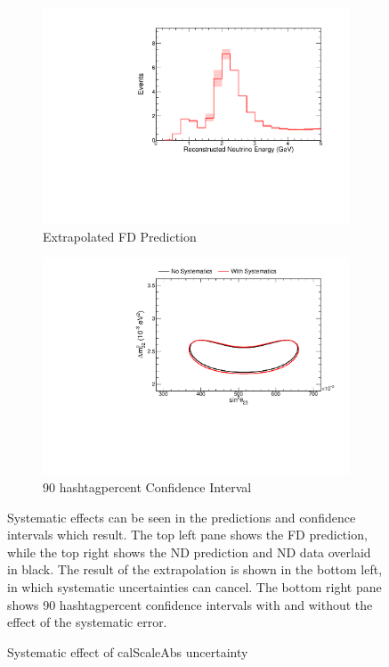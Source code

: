 {\begin{figure}
\begin{center}
\begin{subfigure}[c]{0.49\textwidth}
\includegraphics[width=\textwidth]{figures/systs/prediction/fd_extrap_prediction_calScaleAbs.pdf}
\caption*{Extrapolated FD Prediction}
\end{subfigure}
\begin{subfigure}[c]{0.49\textwidth}
\includegraphics[width=\textwidth]{figures/systs/prediction/fd_extrap_contour_calScaleAbs.pdf}
\caption*{90 hashtagpercent Confidence Interval}
\end{subfigure}
\end{center}
\caption{Systematic effect of calScaleAbs uncertainty}{
Systematic effects can be seen in the predictions and confidence intervals
which result.
The top left pane shows the FD prediction, while the top right shows the
ND prediction and ND data overlaid in black.
The result of the extrapolation is shown in the bottom left, in which
systematic uncertainties can cancel.
The bottom right pane shows 90 hashtagpercent confidence intervals with and without
the effect of the systematic error.}
\label{syst_fig_calScaleAbs}


\end{figure}}
